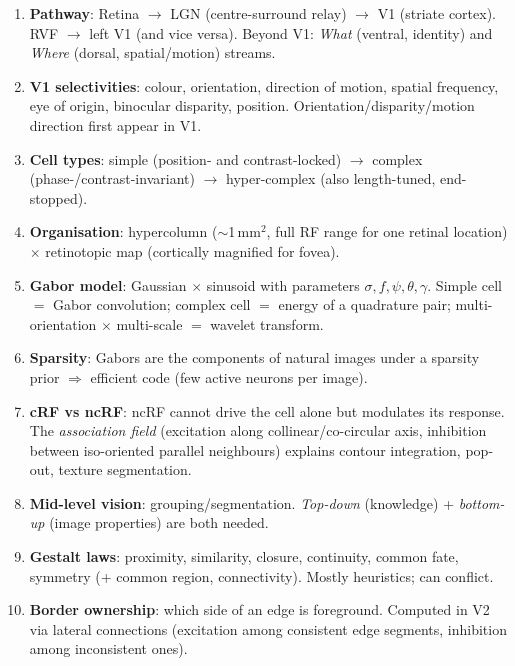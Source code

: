 \begin{keybox}
\begin{enumerate}
  \item \textbf{Pathway}: Retina $\rightarrow$ LGN (centre-surround relay) $\rightarrow$ V1 (striate cortex). RVF $\rightarrow$ left V1 (and vice versa). Beyond V1: \emph{What} (ventral, identity) and \emph{Where} (dorsal, spatial/motion) streams.
  \item \textbf{V1 selectivities}: colour, orientation, direction of motion, spatial frequency, eye of origin, binocular disparity, position. Orientation/disparity/motion direction first appear in V1.
  \item \textbf{Cell types}: simple (position- and contrast-locked) $\rightarrow$ complex (phase-/contrast-invariant) $\rightarrow$ hyper-complex (also length-tuned, end-stopped).
  \item \textbf{Organisation}: hypercolumn ($\sim$1\,mm$^2$, full RF range for one retinal location) $\times$ retinotopic map (cortically magnified for fovea).
  \item \textbf{Gabor model}: Gaussian $\times$ sinusoid with parameters $\sigma, f, \psi, \theta, \gamma$. Simple cell $=$ Gabor convolution; complex cell $=$ energy of a quadrature pair; multi-orientation $\times$ multi-scale $=$ wavelet transform.
  \item \textbf{Sparsity}: Gabors are the components of natural images under a sparsity prior $\Rightarrow$ efficient code (few active neurons per image).
  \item \textbf{cRF vs ncRF}: ncRF cannot drive the cell alone but modulates its response. The \emph{association field} (excitation along collinear/co-circular axis, inhibition between iso-oriented parallel neighbours) explains contour integration, pop-out, texture segmentation.
  \item \textbf{Mid-level vision}: grouping/segmentation. \emph{Top-down} (knowledge) + \emph{bottom-up} (image properties) are both needed.
  \item \textbf{Gestalt laws}: proximity, similarity, closure, continuity, common fate, symmetry (+ common region, connectivity). Mostly heuristics; can conflict.
  \item \textbf{Border ownership}: which side of an edge is foreground. Computed in V2 via lateral connections (excitation among consistent edge segments, inhibition among inconsistent ones).
\end{enumerate}
\end{keybox}

